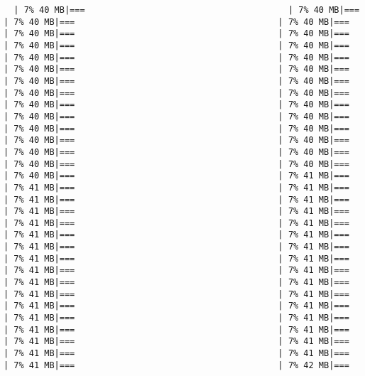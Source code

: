 \documentclass[
]{article}
\begin{document}
\begin{verbatim}
  | 7% 40 MB|===                                        | 7% 40 MB|===                                        | 7% 40 MB|===                                        | 7% 40 MB|===                                        | 7% 40 MB|===                                        | 7% 40 MB|===                                        | 7% 40 MB|===                                        | 7% 40 MB|===                                        | 7% 40 MB|===                                        | 7% 40 MB|===                                        | 7% 40 MB|===                                        | 7% 40 MB|===                                        | 7% 40 MB|===                                        | 7% 40 MB|===                                        | 7% 40 MB|===                                        | 7% 40 MB|===                                        | 7% 40 MB|===                                        | 7% 40 MB|===                                        | 7% 40 MB|===                                        | 7% 40 MB|===                                        | 7% 40 MB|===                                        | 7% 40 MB|===                                        | 7% 40 MB|===                                        | 7% 40 MB|===                                        | 7% 40 MB|===                                        | 7% 40 MB|===                                        | 7% 40 MB|===                                        | 7% 40 MB|===                                        | 7% 40 MB|===                                        | 7% 41 MB|===                                        | 7% 41 MB|===                                        | 7% 41 MB|===                                        | 7% 41 MB|===                                        | 7% 41 MB|===                                        | 7% 41 MB|===                                        | 7% 41 MB|===                                        | 7% 41 MB|===                                        | 7% 41 MB|===                                        | 7% 41 MB|===                                        | 7% 41 MB|===                                        | 7% 41 MB|===                                        | 7% 41 MB|===                                        | 7% 41 MB|===                                        | 7% 41 MB|===                                        | 7% 41 MB|===                                        | 7% 41 MB|===                                        | 7% 41 MB|===                                        | 7% 41 MB|===                                        | 7% 41 MB|===                                        | 7% 41 MB|===                                        | 7% 41 MB|===                                        | 7% 41 MB|===                                        | 7% 41 MB|===                                        | 7% 41 MB|===                                        | 7% 41 MB|===                                        | 7% 41 MB|===                                        | 7% 41 MB|===                                        | 7% 41 MB|===                                        | 7% 41 MB|===                                        | 7% 41 MB|===                                        | 7% 41 MB|===                                        | 7% 42 MB|===         
\end{verbatim}
\end{document}
